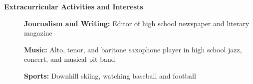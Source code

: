\documentclass[letterpaper,10.6pt]{article}
\newcommand{\resheading}[1]{{\large \colorbox{mygrey}{\begin{minipage}{\textwidth}{\textbf{#1 \vphantom{p\^{E}}}}\end{minipage}}}}
\begin{document}
\resheading{Extracurricular Activities and Interests}
{\small
	\begin{description}
		\item[] \hspace{0.03in} \textbf{Journalism and Writing:} { \footnotesize Editor of high school newspaper and literary magazine}
		\item[] \hspace{0.03in} \textbf{Music:} {\footnotesize Alto, tenor, and baritone saxophone player in high school jazz, concert, and musical pit band}
		\item[] \hspace{0.03in} \textbf{Sports:} {\footnotesize Downhill skiing, watching baseball and football}
	\end{description}}
\end{document}
